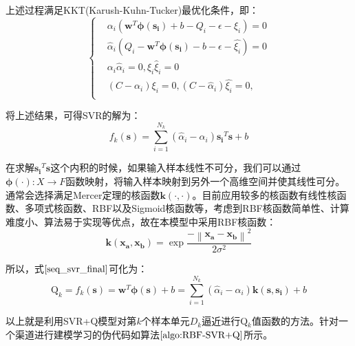 上述过程满足KKT(Karush-Kuhn-Tucker)最优化条件，即：
\begin{equation}
\label{seq_kkt}
\left\{\begin{matrix}
&\alpha_{i}(\bm{w}^{T} \bm{\phi(s_{i})} + b - Q_{i} - \epsilon - \xi_{i})=0
\\ 
&\hat{\alpha}_{i}(Q_{i} - \bm{w}^{T} \bm{\phi(s_{i})} - b - \epsilon - \hat{\xi_{i}})=0
\\ 
&\alpha_{i}\hat{\alpha}_{i}=0, \xi_{i}\hat{\xi}_{i}=0
\\ 
&(C-\alpha_{i})\xi_{i}=0,(C-\hat{\alpha}_{i})\hat{\xi_{i}}=0,
\\
\end{matrix}\right.
\end{equation}

将上述结果，可得SVR的解为：
\begin{equation}
\label{seq_svr_final}
f_{k}(\bm{s})=\sum_{i=1}^{N_{k}}(\hat{\alpha}_{i}-\alpha_{i})\bm{s_{i}}^{T}\bm{s}+b
\end{equation}

在求解$\bm{s_{i}}^{T}\bm{s}$这个内积的时候，如果输入样本线性不可分，我们可以通过$\bm{\phi(\cdot)}:X \to F$函数映射，将输入样本映射到另外一个高维空间并使其线性可分。通常会选择满足Mercer定理的核函数$\bm{k(\cdot,\cdot)}$。目前应用较多的核函数有线性核函数、多项式核函数、RBF以及Sigmoid核函数等，考虑到RBF核函数简单性、计算难度小、算法易于实现等优点，故在本模型中采用RBF核函数：
\begin{equation}
\bm{k(x_{a},x_{b})}=\exp{\frac{-\left \| \bm{x_{a}} - \bm{x_{b}} \right \|^{2}}{2\sigma^{2}}}
\end{equation}

所以，式$\eqref{seq_svr_final}$可化为：
\begin{equation}\label{seq_final}
\text{Q}_{k}=f_{k}(\bm{s})=\bm{w}^{T} \bm{\phi(s)} + b=\sum_{i=1}^{N_{k}}(\hat{\alpha}_{i}-\alpha_{i})\bm{k(s,s_{i})}+b
\end{equation}

以上就是利用SVR+Q模型对第$k$个样本单元$D_{k}$逼近进行Q$_{k}$值函数的方法。针对一个渠道进行建模学习的伪代码如算法$\ref{algo:RBF-SVR+Q}$所示。

